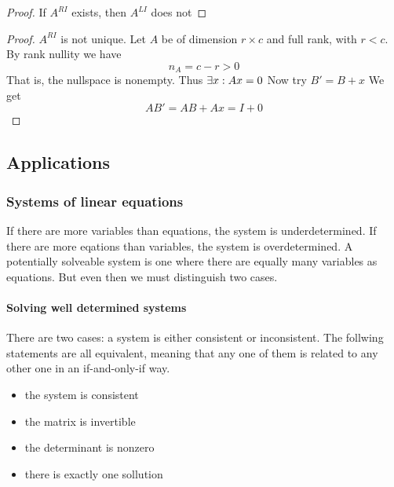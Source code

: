 \begin{proof}
If $A^{RI}$ exists, then $A^{LI}$ does not
\end{proof}

\begin{proof}
    $A^{RI}$ is not unique.
    Let $A$ be of dimension $r \times c$ and full rank, with $r < c$. By rank nullity we have
    $$ n_A = c - r > 0 $$
    That is, the nullspace is nonempty. Thus $\exists x : Ax = 0$
    Now try $B' = B + x$
    We get 
    $$ AB' = AB + Ax = I + 0$$
\end{proof}


















\subsection{Applications}


\subsubsection{Systems of linear equations}
If there are more variables than equations, the system is underdetermined. If there are more eqations than variables, the system is overdetermined. A potentially solveable system is one where there are equally many variables as equations. But even then we must distinguish two cases. 

\paragraph{Solving well determined systems}
There are two cases: a system is either consistent or inconsistent. The follwing statements are all equivalent, meaning that any one of them is related to any other one in an if-and-only-if way. 

\begin{itemize}
    \item the system is consistent
    \item the matrix is invertible
    \item the determinant is nonzero
    \item there is exactly one sollution
\end{itemize}

